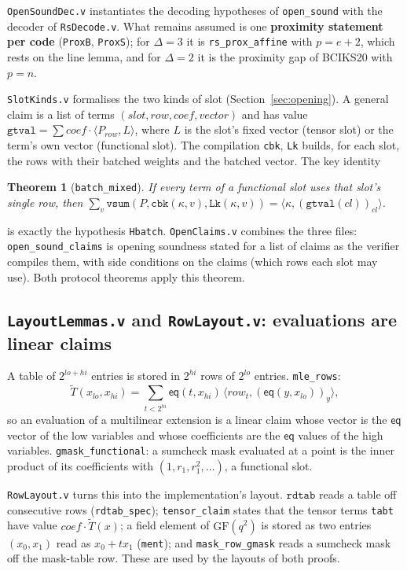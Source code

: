 \documentclass[11pt,a4paper]{article}
\newcommand{\eq}{\mathsf{eq}}
\newcommand{\ip}[2]{\langle #1, #2\rangle}
\newcommand{\mle}[1]{\widetilde{#1}}
\theoremstyle{definition}
\theoremstyle{plain}
\newtheorem{theorem}[definition]{Theorem}
\begin{document}
\texttt{OpenSoundDec.v} instantiates the decoding hypotheses of \texttt{open\_sound} with the decoder
of \texttt{RsDecode.v}. What remains assumed is one \textbf{proximity statement per code}
(\texttt{ProxB}, \texttt{ProxS}); for $\Delta=3$ it is \texttt{rs\_prox\_affine} with $p=e+2$, which rests on
the line lemma, and for $\Delta=2$ it is the proximity gap of BCIKS20 with $p=n$.

\texttt{SlotKinds.v} formalises the two kinds of slot (Section~\ref{sec:opening}). A general claim is a
list of terms $(\mathit{slot},\mathit{row},\mathit{coef},\mathit{vector})$ and has value
$\mathtt{gtval}=\sum\mathit{coef}\cdot\ip{P_{\mathit{row}}}{L}$, where $L$ is the slot's fixed vector
(tensor slot) or the term's own vector (functional slot). The compilation \texttt{cbk}, \texttt{Lk}
builds, for each slot, the rows with their batched weights and the batched vector. The key identity
\begin{theorem}[\texttt{batch\_mixed}]
If every term of a functional slot uses that slot's single row, then
$\sum_v\mathtt{vsum}(P,\mathtt{cbk}(\kappa,v),\mathtt{Lk}(\kappa,v))=\ip{\kappa}{(\mathtt{gtval}(cl))_{cl}}$.
\end{theorem}
is exactly the hypothesis \texttt{Hbatch}. \texttt{OpenClaims.v} combines the three files:
\texttt{open\_sound\_claims} is opening soundness stated for a list of claims as the verifier compiles
them, with side conditions on the claims (which rows each slot may use). Both protocol theorems
apply this theorem.

\subsection{\texttt{LayoutLemmas.v} and \texttt{RowLayout.v}: evaluations are linear claims}

A table of $2^{lo+hi}$ entries is stored in $2^{hi}$ rows of $2^{lo}$ entries. \texttt{mle\_rows}:
\[
  \mle T(x_{lo},x_{hi})=\sum_{t<2^{hi}}\eq(t,x_{hi})\,\ip{\mathit{row}_t}{(\eq(y,x_{lo}))_{y}},
\]
so an evaluation of a multilinear extension is a linear claim whose vector is the $\eq$ vector of
the low variables and whose coefficients are the $\eq$ values of the high variables.
\texttt{gmask\_functional}: a sumcheck mask evaluated at a point is the inner product of its
coefficients with $(1,r_1,r_1^2,\dots)$, a functional slot.

\texttt{RowLayout.v} turns this into the implementation's layout. $\mathtt{rdtab}$ reads a table off
consecutive rows (\texttt{rdtab\_spec}); \texttt{tensor\_claim} states that the tensor terms
\texttt{tabt} have value $\mathit{coef}\cdot\mle T(x)$; a field element of $\mathrm{GF}(q^2)$ is stored as
two entries $(x_0,x_1)$ read as $x_0+tx_1$ (\texttt{ment}); and \texttt{mask\_row\_gmask} reads a
sumcheck mask off the mask-table row. These are used by the layouts of both proofs.
\end{document}
